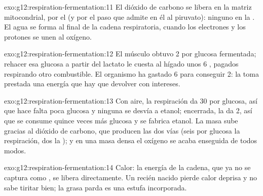 \begin{solution}{exo:g12:respiration-fermentation:11}
El dióxido de carbono se libera en la matriz mitocondrial, por el  (y por el paso que admite en él al piruvato): ninguno en la
. El agua se forma al final de la cadena respiratoria, cuando
los electrones y los protones se unen al oxígeno.
\end{solution}

\begin{solution}{exo:g12:respiration-fermentation:12}
El músculo obtuvo 2  por glucosa fermentada; rehacer esa glucosa a
partir del lactato le cuesta al hígado unos 6 , pagados respirando
otro combustible. El organismo ha gastado 6 para conseguir 2: la
 toma prestada una energía que hay que devolver con
intereses.
\end{solution}

\begin{solution}{exo:g12:respiration-fermentation:13}
Con aire, la respiración da 30  por glucosa, así que hace falta poca
glucosa y ninguna se desvía a etanol; encerrada, la  da 2,
así que se consume quince veces más glucosa y se fabrica etanol. La
masa sube gracias al dióxido de carbono, que producen las dos vías
(seis por glucosa la respiración, dos la ); y en una masa
densa el oxígeno se acaba enseguida de todos modos.
\end{solution}

\begin{solution}{exo:g12:respiration-fermentation:14}
Calor: la energía de la cadena, que ya no se captura como , se
libera directamente. Un recién nacido pierde calor deprisa y no sabe
tiritar bien; la grasa parda es una estufa incorporada.
\end{solution}

